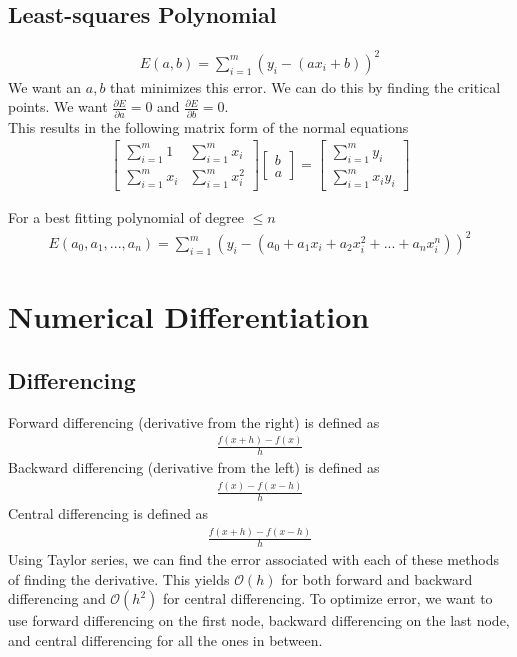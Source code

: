 \documentclass[12pt, letterpaper]{article}
\begin{document}
\subsection{Least-squares Polynomial}
\begin{align*}
    E(a,b) = \displaystyle\sum^m_{i=1}(y_i-(ax_i+b))^2
\end{align*}
We want an $a,b$ that minimizes this error. We can do this by finding the critical points.
We want $\frac{\partial E}{\partial a} = 0$ and $\frac{\partial E}{\partial b} = 0$. \\ 

This results in the following matrix form of the normal equations
\begin{align*}
    \begin{bmatrix}
        \sum_{i=1}^m 1 & \sum_{i=1}^m x_i \\
        \sum_{i=1}^m x_i & \sum_{i=1}^m x_i^2
    \end{bmatrix}
    \begin{bmatrix}
        b \\
        a  
    \end{bmatrix}
    =
    \begin{bmatrix}
        \sum_{i=1}^m y_i  \\
        \sum_{i=1}^m x_i y_i
    \end{bmatrix}
\end{align*}

For a best fitting polynomial of degree $\le n$
\begin{align*}
    E(a_0,a_1,...,a_n)=\displaystyle\sum_{i=1}^m(y_i-(a_0+a_1x_i+a_2x_i^2+...+a_nx_i^n))^2
\end{align*}

\section{Numerical Differentiation}
\subsection{Differencing}
Forward differencing (derivative from the right) is defined as 
\begin{align*}
    \frac{f(x+h)-f(x)}{h}
\end{align*}
Backward differencing (derivative from the left) is defined as 
\begin{align*}
    \frac{f(x)-f(x-h)}{h}
\end{align*}
Central differencing is defined as
\begin{align*}
    \frac{f(x+h)-f(x-h)}{h}
\end{align*}
Using Taylor series, we can find the error associated with each of these methods of 
finding the derivative. This yields $\mathcal{O}(h)$ for both forward and backward 
differencing and $\mathcal{O}(h^2)$ for central differencing. To optimize error, we
want to use forward differencing on the first node, backward differencing on the last 
node, and central differencing for all the ones in between.
\end{document}
